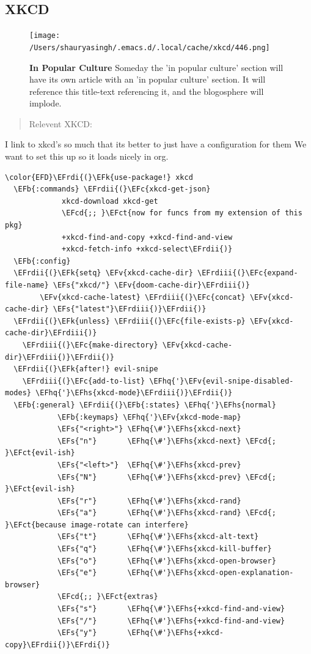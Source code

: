 \documentclass{scrartcl}
\newcommand{\EFk}[1]{\textcolor{EFk}{#1}} %
\newcommand{\EFs}[1]{\textcolor{EFs}{#1}} %
\newcommand{\EFb}[1]{\textcolor{EFb}{#1}} %
\newcommand{\EFct}[1]{\textcolor{EFct}{#1}} %
\newcommand{\EFc}[1]{\textcolor{EFc}{#1}} %
\newcommand{\EFv}[1]{\textcolor{EFv}{#1}} %
\newcommand{\EFcd}[1]{\textcolor{EFcd}{#1}} %
\newcommand{\EFhq}[1]{\textcolor{EFhq}{#1}} %
\newcommand{\EFhs}[1]{\textcolor{EFhs}{#1}} %
\newcommand{\EFrdi}[1]{\textcolor{EFrdi}{#1}} %
\newcommand{\EFrdii}[1]{\textcolor{EFrdii}{#1}} %
\newcommand{\EFrdiii}[1]{\textcolor{EFrdiii}{#1}} %
\begin{document}
\subsection{XKCD}
\label{sec:orged19663}
\begin{figure}[!htb]
	  \centering
	  \texttt{[image: /Users/shauryasingh/.emacs.d/.local/cache/xkcd/446.png]}
  \caption*{\label{xkcd:446} \textbf{In Popular Culture} Someday the 'in popular culture' section will have its own article with an 'in popular culture' section.  It will reference this title-text referencing it, and the blogosphere will implode.}
	\end{figure}

\begin{quote}
Relevent XKCD:
\end{quote}

I link to xkcd's so much that its better to just have a configuration for them
We want to set this up so it loads nicely in org.
\begin{Code}
\begin{Verbatim}[]
\color{EFD}\EFrdi{(}\EFk{use-package!} xkcd
  \EFb{:commands} \EFrdii{(}\EFc{xkcd-get-json}
             xkcd-download xkcd-get
             \EFcd{;; }\EFct{now for funcs from my extension of this pkg}
             +xkcd-find-and-copy +xkcd-find-and-view
             +xkcd-fetch-info +xkcd-select\EFrdii{)}
  \EFb{:config}
  \EFrdii{(}\EFk{setq} \EFv{xkcd-cache-dir} \EFrdiii{(}\EFc{expand-file-name} \EFs{"xkcd/"} \EFv{doom-cache-dir}\EFrdiii{)}
        \EFv{xkcd-cache-latest} \EFrdiii{(}\EFc{concat} \EFv{xkcd-cache-dir} \EFs{"latest"}\EFrdiii{)}\EFrdii{)}
  \EFrdii{(}\EFk{unless} \EFrdiii{(}\EFc{file-exists-p} \EFv{xkcd-cache-dir}\EFrdiii{)}
    \EFrdiii{(}\EFc{make-directory} \EFv{xkcd-cache-dir}\EFrdiii{)}\EFrdii{)}
  \EFrdii{(}\EFk{after!} evil-snipe
    \EFrdiii{(}\EFc{add-to-list} \EFhq{'}\EFv{evil-snipe-disabled-modes} \EFhq{'}\EFhs{xkcd-mode}\EFrdiii{)}\EFrdii{)}
  \EFb{:general} \EFrdii{(}\EFb{:states} \EFhq{'}\EFhs{normal}
            \EFb{:keymaps} \EFhq{'}\EFv{xkcd-mode-map}
            \EFs{"<right>"} \EFhq{\#'}\EFhs{xkcd-next}
            \EFs{"n"}       \EFhq{\#'}\EFhs{xkcd-next} \EFcd{; }\EFct{evil-ish}
            \EFs{"<left>"}  \EFhq{\#'}\EFhs{xkcd-prev}
            \EFs{"N"}       \EFhq{\#'}\EFhs{xkcd-prev} \EFcd{; }\EFct{evil-ish}
            \EFs{"r"}       \EFhq{\#'}\EFhs{xkcd-rand}
            \EFs{"a"}       \EFhq{\#'}\EFhs{xkcd-rand} \EFcd{; }\EFct{because image-rotate can interfere}
            \EFs{"t"}       \EFhq{\#'}\EFhs{xkcd-alt-text}
            \EFs{"q"}       \EFhq{\#'}\EFhs{xkcd-kill-buffer}
            \EFs{"o"}       \EFhq{\#'}\EFhs{xkcd-open-browser}
            \EFs{"e"}       \EFhq{\#'}\EFhs{xkcd-open-explanation-browser}
            \EFcd{;; }\EFct{extras}
            \EFs{"s"}       \EFhq{\#'}\EFhs{+xkcd-find-and-view}
            \EFs{"/"}       \EFhq{\#'}\EFhs{+xkcd-find-and-view}
            \EFs{"y"}       \EFhq{\#'}\EFhs{+xkcd-copy}\EFrdii{)}\EFrdi{)}
\end{Verbatim}
\end{Code}
\end{document}
